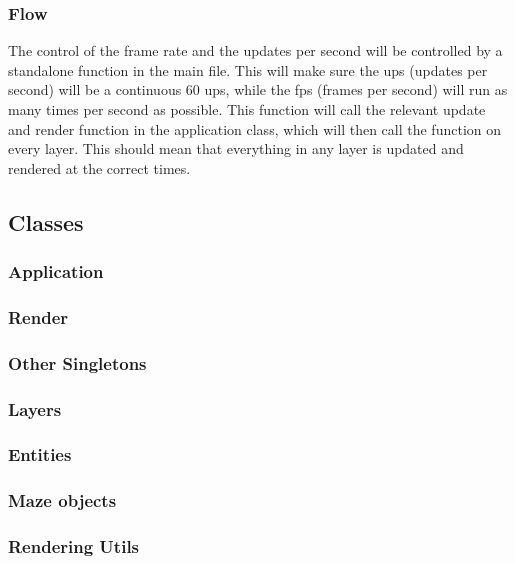 \documentclass[../Main.tex]{subfiles}
\begin{document}
        \subsubsection{Flow}
            The control of the frame rate and the updates per second will be controlled by a standalone function in the main file. This will make sure the ups (updates per second) will be a continuous 60 ups, while the fps (frames per second) will run as many times per second as possible. This function will call the relevant update and render function in the application class, which will then call the function on every layer. This should mean that everything in any layer is updated and rendered at the correct times.
    \clearpage
    \subsection{Classes}
        \subsubsection{Application}
            
            \clearpage
        \subsubsection{Render}
            
        \clearpage
        \subsubsection{Other Singletons}
            
        \clearpage
        \subsubsection{Layers}
            
        \clearpage
        \subsubsection{Entities}
            
        \clearpage
        \subsubsection{Maze objects}
            
        \clearpage
        \subsubsection{Rendering Utils}
            
        \clearpage
\end{document}
